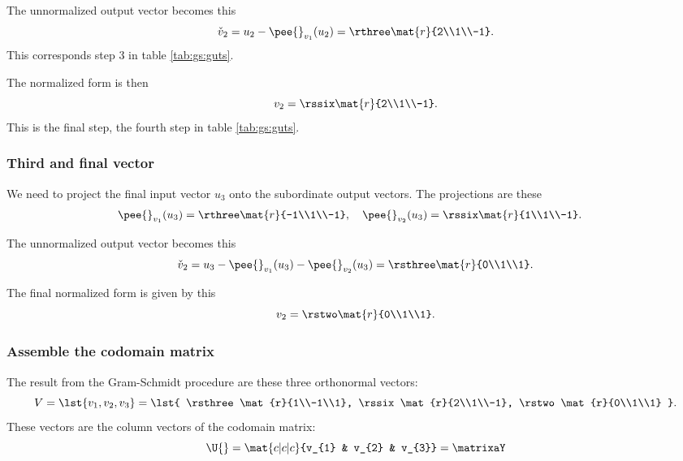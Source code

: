 The unnormalized output vector becomes this
\begin{equation}
  \check{v}_{2}= u_{2} - \pee{}_{v_{1}}(u_{2}) = \rthree \mat{r}{2\\1\\-1}.
\end{equation}
This corresponds step 3 in table \eqref{tab:gs:guts}.

The normalized form is then
\begin{equation}
  v_{2} = \rssix \mat{r}{2\\1\\-1}.
\end{equation}
This is the final step, the fourth step in table \eqref{tab:gs:guts}.

\subsubsection{Third and final vector}
We need to project the final input vector $u_{3}$ onto the subordinate output vectors. The projections are these
\begin{equation}
  \begin{split}
    \pee{}_{v_{1}}(u_{3}) = \rthree \mat{r}{-1\\1\\-1}, \quad \pee{}_{v_{2}}(u_{3}) &= \rssix   \mat{r}{1\\1\\-1}.
  \end{split}
\end{equation}

The unnormalized output vector becomes this
\begin{equation}
  \check{v}_{2}= u_{3} - \pee{}_{v_{1}}(u_{3}) - \pee{}_{v_{2}}(u_{3}) = \rsthree \mat{r}{0\\1\\1}.
\end{equation}

The final normalized form is given by this
\begin{equation}
  v_{2} = \rstwo \mat{r}{0\\1\\1}.
\end{equation}

\subsubsection{Assemble the codomain matrix}
The result from the Gram-Schmidt procedure are these three orthonormal vectors:
\begin{equation}
  V = \lst{v_{1},v_{2},v_{3}} = \lst{
  \rsthree \mat{r}{1\\-1\\1},
  \rssix   \mat{r}{2\\1\\-1},
  \rstwo   \mat{r}{0\\1\\1}
  }.
\end{equation}
These vectors are the column vectors of the codomain matrix:
\begin{equation}
  \U{} = \mat{c|c|c}{v_{1} & v_{2} & v_{3}} = \matrixaY
\end{equation}

